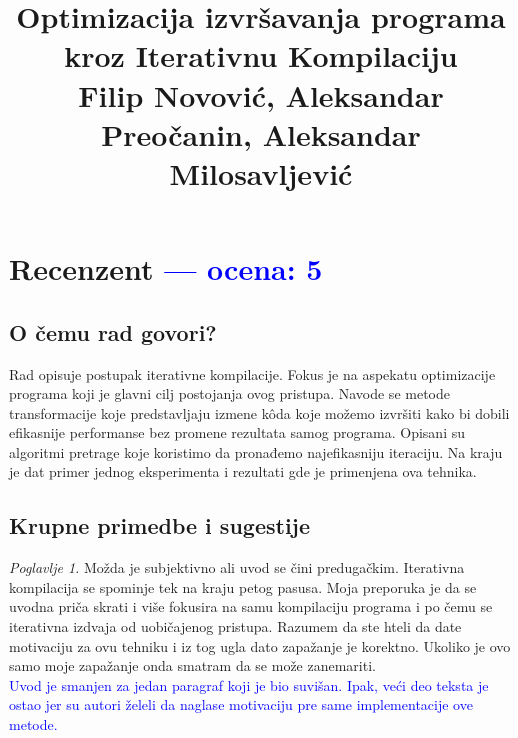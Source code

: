 \documentclass[a4paper]{report}
\newcommand{\odgovor}[1]{\textcolor{blue}{#1}}
\begin{document}
\title{Optimizacija izvršavanja programa kroz Iterativnu Kompilaciju\\ \small{Filip Novović, Aleksandar Preočanin, Aleksandar Milosavljević}}

\maketitle

\tableofcontents

\chapter{Recenzent \odgovor{--- ocena: 5 } }


\section{O čemu rad govori?}
Rad opisuje postupak iterativne kompilacije. Fokus je na aspekatu optimizacije programa koji je glavni cilj postojanja ovog pristupa. Navode se metode transformacije koje predstavljaju izmene kôda koje možemo izvršiti kako bi dobili efikasnije performanse bez promene rezultata samog programa. Opisani su algoritmi pretrage koje koristimo da pronađemo najefikasniju iteraciju. Na kraju je dat primer jednog eksperimenta i rezultati gde je primenjena ova tehnika.

\section{Krupne primedbe i sugestije}

\textit{Poglavlje 1.} Možda je subjektivno ali uvod se čini predugačkim. Iterativna kompilacija se spominje tek na kraju petog pasusa. Moja preporuka je da se uvodna priča skrati i više fokusira na samu kompilaciju programa i po čemu se iterativna izdvaja od uobičajenog pristupa. Razumem da ste hteli da date motivaciju za ovu tehniku i iz tog ugla dato zapažanje je korektno. Ukoliko je ovo samo moje zapažanje onda smatram da se može zanemariti. \\
\odgovor{ Uvod je smanjen za jedan paragraf koji je bio suvišan. Ipak, veći deo teksta je ostao jer su autori želeli da naglase motivaciju pre same implementacije ove metode. }
\\
\end{document}
